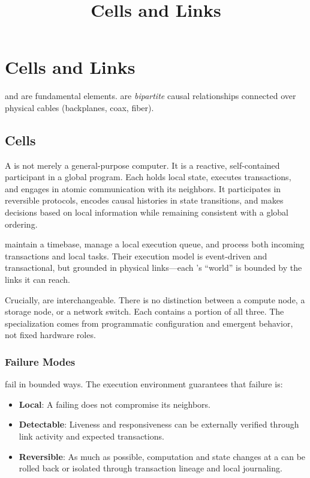 \documentclass[../OAE-SPEC-MAIN.tex]{subfiles}
\title{Cells and Links}
\begin{document}
\chapter{Cells and Links}\label{sec:cells-and-links}

\CELLs and \LINKs are  fundamental elements. \LINKs are \emph{bipartite} causal relationships connected over physical cables (backplanes, coax, fiber). 






\section{Cells}

A \CELL is not merely a general-purpose computer. It is a reactive, self-contained participant in a global program. Each \CELL holds local state, executes transactions, and engages in atomic communication with its neighbors. It participates in reversible protocols, encodes causal histories in state transitions, and makes decisions based on local information while remaining consistent with a global ordering.

\CELLs maintain a timebase, manage a local execution queue, and process both incoming transactions and local tasks. Their execution model is event-driven and transactional, but grounded in physical links—each \CELL’s “world” is bounded by the links it can reach.

Crucially, \CELLs are interchangeable. There is no distinction between a compute node, a storage node, or a network switch. Each \CELL contains a portion of all three. The specialization comes from programmatic configuration and emergent behavior, not fixed hardware roles.

\subsection{Failure Modes}

\CELLs fail in bounded ways. The execution environment guarantees that failure is:
\begin{itemize}
\item \textbf{Local}: A failing \CELL does not compromise its neighbors.
\item \textbf{Detectable}: Liveness and responsiveness can be externally verified through link activity and expected transactions.
\item \textbf{Reversible}: As much as possible, computation and state changes at a \CELL can be rolled back or isolated through transaction lineage and local journaling.
\end{itemize}
\end{document}
